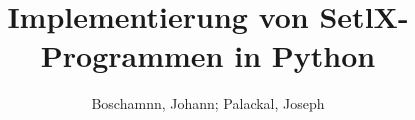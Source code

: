 \documentclass{report}
\begin{document}
\title{Implementierung von SetlX-Programmen in Python}
\author{Boschamnn, Johann; Palackal, Joseph}

\tableofcontents

\clearpage
{}
\listoffigures

\clearpage
{}
\listoftables







\newpage
\end{document}
